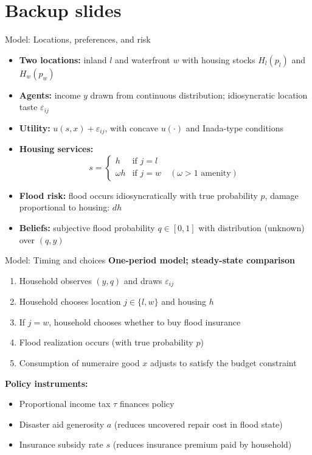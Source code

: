 \documentclass[xcolor=dvipsnames, aspectratio = 169]{beamer}
\begin{document}
{%

\section{Backup slides}


\begin{frame}{Model: Locations, preferences, and risk}
\begin{itemize}[leftmargin=0.0cm]
    \setlength{\itemsep}{0.3cm}
    \item[] \textbf{Two locations:} inland $l$ and waterfront $w$ with housing stocks $H_l(p_l)$ and $H_w(p_w)$
\item[] \textbf{Agents:} income $y$ drawn from continuous distribution; idiosyncratic location taste $\varepsilon_{ij}$
\item[] \textbf{Utility:} $u(s,x) + \varepsilon_{ij}$, with concave $u(\cdot)$ and Inada-type conditions
\item[] \textbf{Housing services:}
\[
s =
\begin{cases}
h & \text{if } j=l \\
\omega h & \text{if } j=w \quad (\omega>1 \text{ amenity})
\end{cases}
\]
\item[] \textbf{Flood risk:} flood occurs idiosyncratically with true probability $p$, damage proportional to housing: $dh$
\item[] \textbf{Beliefs:} subjective flood probability $q\in[0,1]$ with distribution (unknown) over $(q,y)$
\end{itemize}
\end{frame}

\begin{frame}{Model: Timing and choices}
\textbf{One-period model; steady-state comparison}\\
\begin{enumerate}[label=\arabic*.] 
  \item Household observes $(y,q)$ and draws $\varepsilon_{ij}$
  \item Household chooses location $j\in\{l,w\}$ and housing $h$
  \item If $j=w$, household chooses whether to buy flood insurance
  \item Flood realization occurs (with true probability $p$)
  \item Consumption of numeraire good $x$ adjusts to satisfy the budget constraint
\end{enumerate}
\vspace{0.4em}
\textbf{Policy instruments:}
\begin{itemize}
  \item Proportional income tax $\tau$ finances policy
  \item Disaster aid generosity $a$ (reduces uncovered repair cost in flood state)
  \item Insurance subsidy rate $s$ (reduces insurance premium paid by household)
\end{itemize}
\end{frame}

}
\end{document}
